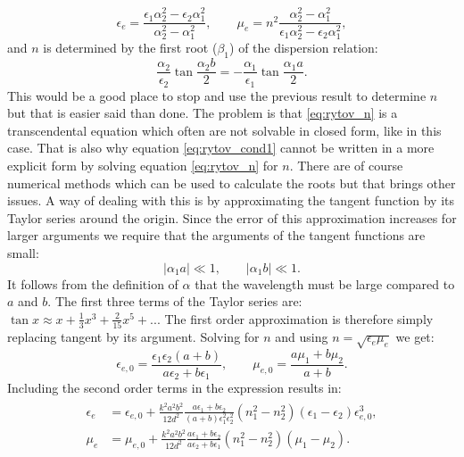 \begin{equation}
    \epsilon_e = \frac{\epsilon_1 \alpha_2^2 - \epsilon_2 \alpha_1^2}{\alpha_2^2-\alpha_1^2},
    \qquad
    \mu_e = n^2\frac{\alpha_2^2-\alpha_1^2}{\epsilon_1 \alpha_2^2 - \epsilon_2 \alpha_1^2},
\end{equation}
and $n$ is determined by the first root ($\beta_1$) of the dispersion relation:
\begin{equation}
    \label{eq:rytov_n}
    \frac{\alpha_2}{\epsilon_2}\tan \frac{\alpha_2 b}{2} = -\frac{\alpha_1}{\epsilon_1}\tan \frac{\alpha_1 a}{2}.    
\end{equation}
This would be a good place to stop and use the previous result to determine $n$ but that is easier said than done. The problem is that \ref{eq:rytov_n} is a transcendental equation which often are not solvable in closed form, like in this case. That is also why equation \ref{eq:rytov_cond1} cannot be written in a more explicit form by solving equation \ref{eq:rytov_n} for $n$. There are of course numerical methods which can be used to calculate the roots but that brings other issues. A way of dealing with this is by approximating the tangent function by its Taylor series around the origin. Since the error of this approximation increases for larger arguments we require that the arguments of the tangent functions are small:
\begin{equation}
    |\alpha_1 a| \ll 1, 
    \qquad
    |\alpha_1 b| \ll 1.
\end{equation}
It follows from the definition of $\alpha$ that the wavelength must be large compared to $a$ and $b$. The first three terms of the Taylor series are: $\tan x \approx x + \frac{1}{3}x^3 + \frac{2}{15}x^5 + ...$ The first order approximation is therefore simply replacing tangent by its argument. Solving for $n$ and using $n=\sqrt{\epsilon_e \mu_e}$ we get:
\begin{equation}
    \label{eq:rytov_1st_order}
    \epsilon_{e,0} = \frac{\epsilon_1 \epsilon_2 (a+b)}{a\epsilon_2+b\epsilon_1},
    \qquad
    \mu_{e,0} = \frac{a\mu_1+b\mu_2}{a+b}.
\end{equation}
Including the second order terms in the expression results in:
\begin{align}
\begin{split}
    \label{eq:rytov_2nd_order}
    \epsilon_{e} &= \epsilon_{e,0} + \frac{k^2a^2b^2}{12d^2} \frac{a\epsilon_1+b\epsilon_2}{(a+b)\epsilon_1^2\epsilon_2^2}\left(n_1^2-n_2^2\right)\left(\epsilon_1-\epsilon_2\right)\epsilon_{e,0}^3,
    \\
    \mu_{e} &= \mu_{e,0} + \frac{k^2a^2b^2}{12d^2}\frac{a\epsilon_1 + b\epsilon_2}{a\epsilon_2 + b\epsilon_1}\left(n_1^2-n_2^2\right)\left(\mu_1-\mu_2\right).
\end{split}
\end{align}
